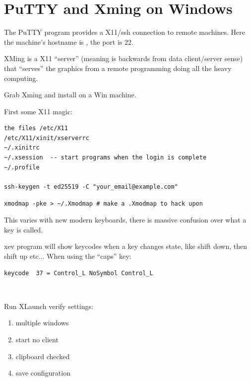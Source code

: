 \section{PuTTY and Xming on Windows} \label{sec:puttyxming}

The PuTTY program provides a X11/ssh connection to remote machines. Here
the machine's hostname is , the port is 22.

XMing is a X11 ``server'' (meaning is backwards from data client/server sense) that
``serves'' the graphics from a remote programming doing all the heavy computing.

Grab Xming and install on a Win machine.

First some X11 magic:

\begingroup \fontsize{10pt}{10pt}
\selectfont
\begin{verbatim} 
the files /etc/X11
/etc/X11/xinit/xserverrc
~/.xinitrc
~/.xsession  -- start programs when the login is complete
~/.profile

ssh-keygen -t ed25519 -C "your_email@example.com"

\end{verbatim}
\endgroup



\verb=xmodmap -pke > ~/.Xmodmap # make a .Xmodmap to hack upon=

This varies with new modern keyboards, there is massive
confusion over what a key is called. 

xev program will show keycodes when a key changes state,
like shift down, then shift up etc...
When using the ``caps'' key:

\verb/keycode  37 = Control_L NoSymbol Control_L/

\begingroup \fontsize{10pt}{10pt}
\selectfont
\begin{verbatim} 


\end{verbatim}
\endgroup


Run XLaunch verify settings:

\vspace{-.15cm}
\begin{enumerate}\addtolength{\itemsep}{-0.5\baselineskip}
   \item   multiple windows
   \item   start no client
   \item   clipboard checked
   \item   save configuration
\end{enumerate}


